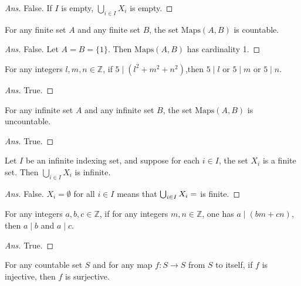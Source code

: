 \documentclass[12pt]{article}
\newenvironment{problem}[2][Problem]{\begin{trivlist}
\item[\hskip \labelsep {\bfseries #1}\hskip \labelsep {\bfseries #2.}]}{\end{trivlist}}
\begin{document}
\begin{proof}[Ans]
False. If $I$ is empty, $\bigcup_{i \in I} X_i$ is empty.
\end{proof}

\begin{problem}{53}
For any finite set $A$ and any finite set $B$, the set $\text{Maps}(A, B)$ is countable.
\end{problem}

\begin{proof}[Ans]
False. Let $A = B = \{1\}$. Then $\text{Maps}(A, B)$ has cardinality 1.
\end{proof}

\begin{problem}{54}
For any integers $l, m, n \in \mathbb{Z}$, if $5 \mid (l^2 + m^2 + n^2)$,then $5 \mid l$ or $5 \mid m$ or $5 \mid n$.  
\end{problem}

\begin{proof}[Ans]
True.
\end{proof}

\begin{problem}{55}
For any infinite set $A$ and any infinite set $B$, the set $\text{Maps}(A, B)$ is uncountable.
\end{problem}

\begin{proof}[Ans]
True.
\end{proof}

\begin{problem}{56}
Let $I$ be an infinite indexing set, and suppose for each $i \in I$, the set $X_i$ is a finite set. Then $\bigcup_{i \in I} X_i$ is infinite.
\end{problem}

\begin{proof}[Ans]
False. $X_i = \emptyset$ for all $i \in I$ means that $\bigcup_{i \in I} X_i = \empty$ is finite.
\end{proof}

\begin{problem}{57}
For any integers $a, b, c \in \mathbb{Z}$, if for any integers $m, n \in \mathbb{Z}$, one has $a \mid (bm + cn)$, then $a \mid b$ and $a \mid c$.
\end{problem}

\begin{proof}[Ans]
True.
\end{proof}

\begin{problem}{58}
For any countable set $S$ and for any map $f : S \rightarrow S$ from $S$ to itself, if $f$ is injective, then $f$ is surjective.
\end{problem}
\end{document}
